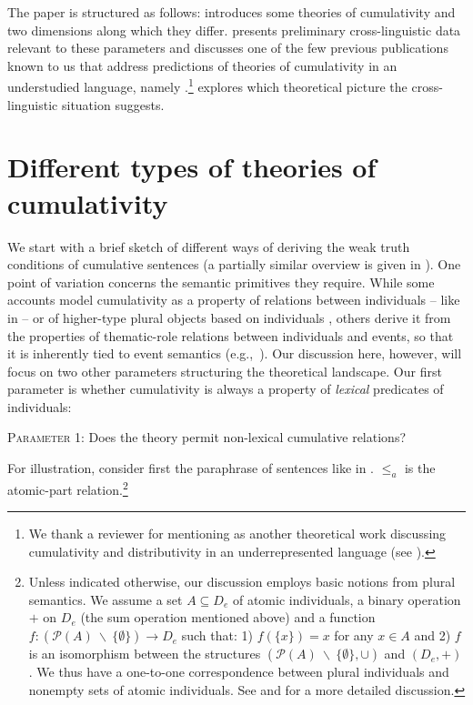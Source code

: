 \documentclass[output=paper]{langscibook}
\begin{document}
The paper is structured as follows:  introduces some theories of cumulativity and two dimensions along which they differ.  presents preliminary cross-linguistic data relevant to these parameters and discusses one of the few previous publications known to us that address predictions of theories of cumulativity in an understudied language, namely \citet{Beck:2012}.\footnote{We thank a reviewer for mentioning \citet{Henderson:2012} as another theoretical work discussing cumulativity and distributivity in an underrepresented language (see ).}  explores which theoretical picture the cross-linguistic situation suggests.

\section{Different types of theories of cumulativity}\label{has-sch:sec:2}


We start with a brief sketch of different ways of deriving the weak truth conditions of cumulative sentences (a partially similar overview is given in \citealt{Champollion:2015b}). One point of variation concerns the semantic primitives they require. While some accounts \citep{Scha:1981,Krifka:1986,Beck:2000a,Champollion:2010a} model cumulativity as a property of relations between individuals -- like  in  -- or of higher-type plural objects based on individuals \citep{Schmitt:2019}, others derive it from the properties of thematic-role relations between individuals and events, so that it is inherently tied to event semantics (e.g.,~\citealt{Schein:1993, Landman:2000, Kratzer:2003, Ferreira:2005, Zweig:2008, Zweig:2009}). Our discussion here, however, will focus on two other parameters structuring the theoretical landscape. Our first parameter is whether cumulativity is always a property of \textit{lexical}  predicates of individuals:

\ea\label{has-sch:par1} \textsc{Parameter 1:} Does the theory permit non-lexical cumulative relations?\z

\noindent For illustration, consider first the paraphrase of sentences like  in . 
 $\leq_a$ is the atomic-part relation.\footnote{Unless indicated otherwise, our discussion employs basic notions from plural semantics.  We assume a set $A \subseteq D_e$ of atomic individuals, a binary operation $+$ on $D_e$  (the sum operation mentioned above) and a function $f: (\mathcal{P}(A)\ \backslash\ \{\emptyset\}) \to D_e$ such that: 1) $f(\{x\}) = x$ for any $x \in A$ and 2) $f$ is an isomorphism between the structures $(\mathcal{P}(A)\ \backslash\ \{\emptyset\}, \cup)$ and $(D_e, +)$. We thus have a one-to-one correspondence between plural individuals and nonempty sets of atomic individuals. See \citet{Link:1983} and \citet{Champollion:2016Mereology} for a more detailed discussion.} 
 
\end{document}
